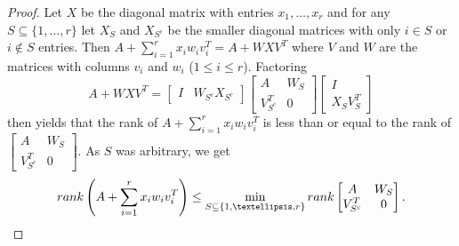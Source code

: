 \documentclass[10pt,a4paper]{amsart}
\begin{document}
\begin{proof}
Let $X$ be the diagonal matrix with entries $x_1, \ldots, x_r$ and for any $S \subseteq \{1, \ldots, r\}$ let $X_S$ and $X_{S^c}$ be the smaller diagonal matrices with only $i \in S$ or $i \not\in S$ entries. Then $A + \sum_{i=1}^r x_iw_iv_i^T = A + WXV^T$ where $V$ and $W$ are the matrices with columns $v_i$ and $w_i$ ($1 \leq i \leq r$). Factoring $$A + WXV^T = \left[\begin{matrix}I& W_{S^c}X_{S^c}\end{matrix}\right]\left[\begin{matrix}A& W_S\\ V_{S^c}^T&0\end{matrix}\right]\left[\begin{matrix}I\\ X_SV_S^T\end{matrix}\right]$$ then yields that the rank of $A + \sum_{i=1}^r x_iw_iv_i^T$ is less than or equal to the rank of $\left[\begin{matrix} A&W_S\\ V_{S^c}^T&0\end{matrix}\right]$. As $S$ was arbitrary, we get $${\rm rank}\left(A + \sum_{i=1}^r x_iw_iv_i^T\right) \leq \min_{S \subseteq \{1, \ldots, r\}} {\rm rank} \left[\begin{matrix} A&W_S\\ V_{S^c}^T&0\end{matrix}\right].$$


\end{proof}
\end{document}
